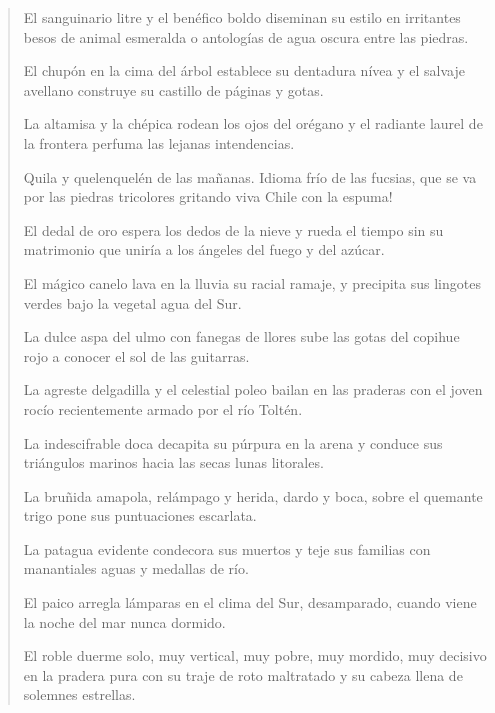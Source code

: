 \documentclass[12pt]{article}
\begin{document}
\clearpage
{}
\begin{verse}
El sanguinario litre y el benéfico boldo  
diseminan su estilo  
en irritantes besos de animal esmeralda  
o antologías de agua oscura entre las piedras.  
	
	El chupón en la cima del árbol establece  
	su dentadura nívea  
	y el salvaje avellano construye su castillo  
	de páginas y gotas.  
	
La altamisa y la chépica rodean  
los ojos del orégano  
y el radiante laurel de la frontera  
perfuma las lejanas intendencias.  
	
	Quila y quelenquelén de las mañanas.  
	Idioma frío de las fucsias,  
	que se va por las piedras tricolores  
	gritando viva Chile con la espuma!  
	
El dedal de oro espera  
los dedos de la nieve  
y rueda el tiempo sin su matrimonio  
que uniría a los ángeles del fuego y del azúcar.  
	
	El mágico canelo  
	lava en la lluvia su racial ramaje,  
	y precipita sus lingotes verdes  
	bajo la vegetal agua del Sur.  
	
La dulce aspa del ulmo  
con fanegas de llores  
sube las gotas del copihue rojo  
a conocer el sol de las guitarras.  
	
	La agreste delgadilla  
	y el celestial poleo  
	bailan en las praderas con el joven rocío  
	recientemente armado por el río Toltén.  
	
La indescifrable doca  
decapita su púrpura en la arena  
y conduce sus triángulos marinos  
hacia las secas lunas litorales.  
	
	La bruñida amapola,  
	relámpago y herida, dardo y boca,  
	sobre el quemante trigo  
	pone sus puntuaciones escarlata.  
	
La patagua evidente  
condecora sus muertos  
y teje sus familias  
con manantiales aguas y medallas de río.  
	
	El paico arregla lámparas  
	en el clima del Sur, desamparado,  
	cuando viene la noche  
	del mar nunca dormido.  
	
El roble duerme solo,  
muy vertical, muy pobre, muy mordido,  
muy decisivo en la pradera pura  
con su traje de roto maltratado  
y su cabeza llena de solemnes estrellas.  

\end{verse}
\end{document}
